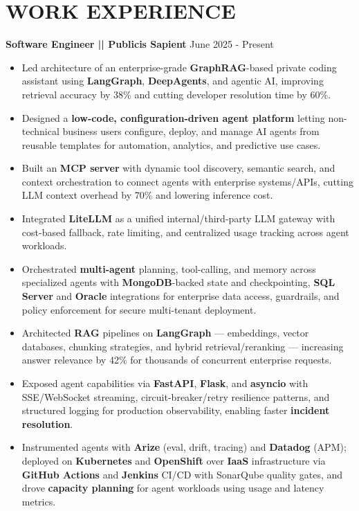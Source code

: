 \documentclass[a4paper]{article}
\begin{document}
\section*{WORK EXPERIENCE}
\textbf{Software Engineer || Publicis Sapient}
\hfill June 2025 - Present
\begin{itemize}
\vspace{1pt}
\item {Led architecture of an enterprise-grade \textbf{GraphRAG}-based private coding assistant using \textbf{LangGraph}, \textbf{DeepAgents}, and agentic AI, improving retrieval accuracy by 38\% and cutting developer resolution time by 60\%.}
\item {Designed a \textbf{low-code, configuration-driven agent platform} letting non-technical business users configure, deploy, and manage AI agents from reusable templates for automation, analytics, and predictive use cases.}
\item {Built an \textbf{MCP server} with dynamic tool discovery, semantic search, and context orchestration to connect agents with enterprise systems/APIs, cutting LLM context overhead by 70\% and lowering inference cost.}
\item {Integrated \textbf{LiteLLM} as a unified internal/third-party LLM gateway with cost-based fallback, rate limiting, and centralized usage tracking across agent workloads.}
\item {Orchestrated \textbf{multi-agent} planning, tool-calling, and memory across specialized agents with \textbf{MongoDB}-backed state and checkpointing, \textbf{SQL Server} and \textbf{Oracle} integrations for enterprise data access, guardrails, and policy enforcement for secure multi-tenant deployment.}
\item {Architected \textbf{RAG} pipelines on \textbf{LangGraph} — embeddings, vector databases, chunking strategies, and hybrid retrieval/reranking — increasing answer relevance by 42\% for thousands of concurrent enterprise requests.}
\item {Exposed agent capabilities via \textbf{FastAPI}, \textbf{Flask}, and \textbf{asyncio} with SSE/WebSocket streaming, circuit-breaker/retry resilience patterns, and structured logging for production observability, enabling faster \textbf{incident resolution}.}
\item {Instrumented agents with \textbf{Arize} (eval, drift, tracing) and \textbf{Datadog} (APM); deployed on \textbf{Kubernetes} and \textbf{OpenShift} over \textbf{IaaS} infrastructure via \textbf{GitHub Actions} and \textbf{Jenkins} CI/CD with SonarQube quality gates, and drove \textbf{capacity planning} for agent workloads using usage and latency metrics.}

\end{itemize}
\end{document}
